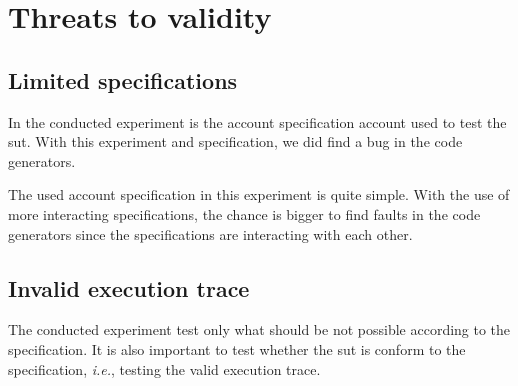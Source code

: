 


\section{Threats to validity}

\subsection*{Limited specifications}
In the conducted experiment is the account specification account used
to test the \gls{sut}. With this experiment and specification,
we did find a bug in the code generators.

The used account specification in this experiment is quite simple. With the use
of more interacting specifications, the chance is bigger to find faults in the code
generators since the specifications are interacting with each other.

\subsection*{Invalid execution trace}
The conducted experiment test only what should be not possible according to the
specification. It is also important to test whether the \gls{sut} is conform to the
specification, \textit{i.e.}, testing the valid execution trace.
